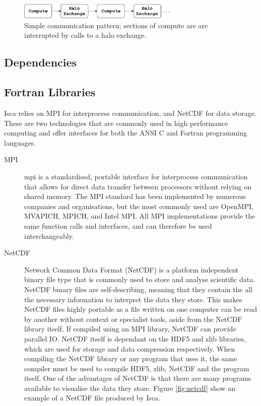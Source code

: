 \documentclass[a4paper,11pt]{report}
\begin{document}
\begin{figure}[htbp]
\begin{center}
\includegraphics[width=0.7\textwidth]{img/comm_pattern.pdf}
\caption{Simple communication pattern; sections of compute are are interrupted by calls to a halo exchange.}
\label{fig:halo-exchange}
\end{center}
\end{figure}


\subsection{Dependencies}
\subsection{Fortran Libraries}
Isca relies on MPI for interprocess communication, and NetCDF for data storage. These are two technologies that are commonly used in high performance computing and offer interfaces for both the ANSI C and Fortran programming languages.

\begin{description}
	\item[MPI] \gls{mpi} is a standardised, portable interface for interprocess communication that allows for direct data transfer between processors without relying on shared memory. The MPI standard has been implemented by numerous companies and organisations, but the most commonly used are OpenMPI, MVAPICH, MPICH, and Intel MPI. All MPI implementations provide the same function calls and interfaces, and can therefore be used interchangeably. 
	
	\item[NetCDF] Network Common Data Format (NetCDF) is a platform independent binary file type that is commonly used to store and analyse scientific data. NetCDF binary files are self-describing, meaning that they contain the all the necessary information to interpret the data they store. This makes NetCDF files highly portable as a file written on one computer can be read by another without context or specialist tools, aside from the NetCDF library itself. If compiled using an MPI library, NetCDF can provide parallel IO. NetCDF itself is dependant on the HDF5 and zlib libraries, which are used for storage and data compression respectively. When compiling the NetCDF library or any program that uses it, the same compiler must be used to compile HDF5, zlib, NetCDF and the program itself. One of the advantages of NetCDF is that there are many programs available to visualise the data they store. Figure  \ref{fig:netcdf} show an example of a NetCDF file produced by Isca. 
\end{description}
\end{document}
